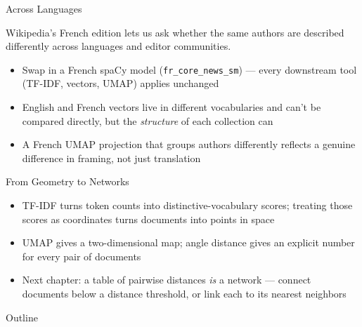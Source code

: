 \documentclass[8pt,aspectratio=169]{beamer}
\begin{document}
\begin{textframe}{Across Languages}

Wikipedia's French edition lets us ask whether the same authors are described differently across languages and editor communities.

\begin{itemize}
\item Swap in a French spaCy model (\texttt{fr\_core\_news\_sm}) --- every downstream tool (TF-IDF, vectors, UMAP) applies unchanged
\item English and French vectors live in different vocabularies and can't be compared directly, but the \textit{structure} of each collection can
\item A French UMAP projection that groups authors differently reflects a genuine difference in framing, not just translation
\end{itemize}

\end{textframe}

\begin{textframe}{From Geometry to Networks}

\begin{itemize}
\item TF-IDF turns token counts into distinctive-vocabulary scores; treating those scores as coordinates turns documents into points in space
\item UMAP gives a two-dimensional map; angle distance gives an explicit number for every pair of documents
\item Next chapter: a table of pairwise distances \textit{is} a network --- connect documents below a distance threshold, or link each to its nearest neighbors
\end{itemize}

\end{textframe}

\begin{outlineframe}{Outline}
\end{outlineframe}
\end{document}
